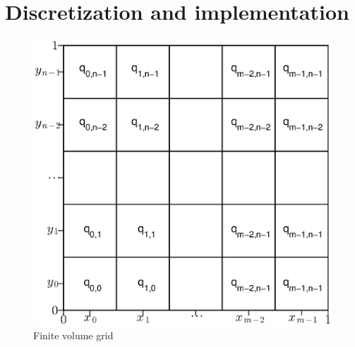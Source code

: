 \section{Discretization and implementation} 

\label{sec:discretization_and_implementation} 
\begin{figure}[htbp] 
	\centering 
	\includegraphics[width=.7\textwidth]{Figures/gridForNumericalSchemePlot.eps} \caption{Finite volume grid} \label{fig:Figures_gridForNumericalSchemePlot} 
\end{figure}

